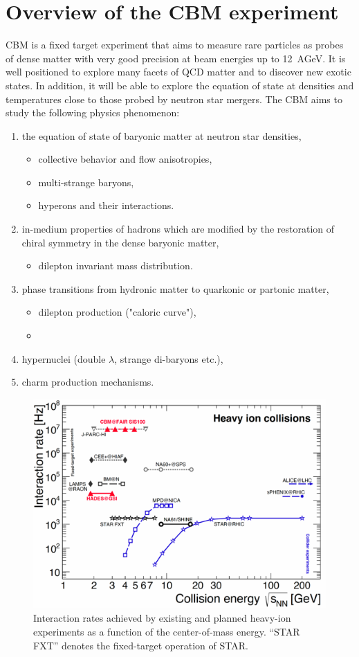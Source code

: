 
\section{Overview of the CBM experiment}
\gls{CBM} is a fixed target experiment that aims to measure rare particles as probes of dense matter with very good precision at beam energies up to 12~AGeV. It is well positioned to explore many facets of \gls{QCD} matter and to discover new exotic states. In addition, it will be able to explore the equation of state at densities and temperatures close to those probed by neutron star mergers. The \gls{CBM} aims to study the following physics phenomenon:
\begin{enumerate}
    \item the equation of state of baryonic matter at neutron star densities,
    \begin{itemize}
        \item collective behavior and flow anisotropies,
        \item multi-strange baryons,
        \item hyperons and their interactions.
    \end{itemize}
    \item in-medium properties of hadrons which are modified by the restoration of chiral symmetry in the dense baryonic matter, 
    \begin{itemize}
        \item dilepton invariant mass distribution.
    \end{itemize}
    \item phase transitions from hydronic matter to quarkonic or partonic matter,
    \begin{itemize}
        \item dilepton production ("caloric curve"),
        \item 
    \end{itemize}
    \item hypernuclei (double $\lambda$, strange di-baryons etc.),
    \item charm production mechanisms.
\end{enumerate}

\begin{figure}[!h]
    \centering
    \includegraphics[width=0.6\columnwidth]{Chapter1/images/interaction_rates.png}
    \caption{Interaction rates achieved by existing and planned heavy-ion experiments as a function of the center-of-mass energy. “STAR FXT” denotes the fixed-target operation of STAR. ~\cite{Ablyazimov_2017}}
    \label{fig:cbm_density}
\end{figure}


